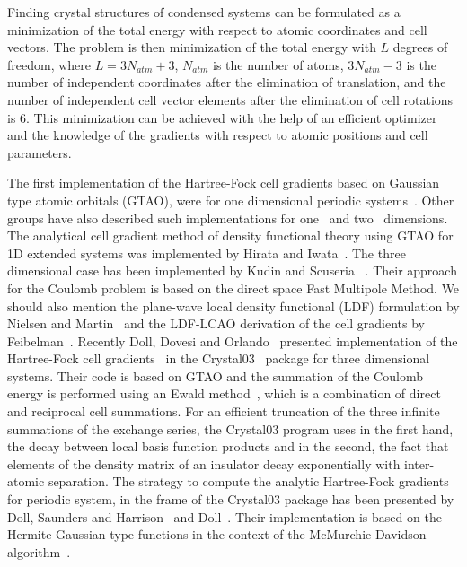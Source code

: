 \documentclass[prl,preprint,doublespace]{revtex4} %
\begin{document}
Finding crystal structures of condensed systems can
be formulated as a minimization of the total energy 
with respect to atomic coordinates and cell vectors.
The problem is then minimization of the total energy with $L$ degrees of freedom, where
$L=3N_{atm}+3$, $N_{atm}$ is the number of atoms, $3N_{atm}-3$ is the number
of independent coordinates after the elimination of translation, 
and the number of independent cell vector elements
after the elimination of cell rotations is 6.
This minimization can be achieved with the help of an efficient optimizer~\cite{KNemeth04,TBucko05,KNemeth05}
and the knowledge of the gradients with respect to atomic positions and cell parameters.
                                  
The first implementation of the Hartree-Fock cell gradients based on 
Gaussian type atomic orbitals (GTAO),
were for one dimensional periodic systems~\cite{HTeramae83,HTeramae84}. 
Other groups have also described such implementations for 
one~\cite{DJacquemin99A,DJacquemin99B} and two~\cite{MTobita03} dimensions. 
The analytical cell gradient method of density functional theory using GTAO for 
1D extended systems was implemented by Hirata and Iwata~\cite{SHirata98}.
The three dimensional case has been implemented by Kudin and Scuseria 
~\cite{KKudin00A,KKudin00B}. Their approach for the Coulomb problem is 
based on the direct space Fast Multipole Method.
We should also mention the plane-wave local density functional (LDF) formulation
by Nielsen and Martin~\cite{ONielsen85} and the LDF-LCAO derivation of 
the cell gradients by Feibelman~\cite{PFeibelman91}.
Recently Doll, Dovesi and Orlando~\cite{KDoll04} presented 
implementation of the Hartree-Fock cell gradients~\cite{RDovesi00} in 
the {\sc Crystal03}~\cite{Crystal03} package for three dimensional systems. 
Their code is based on GTAO and the summation 
of the Coulomb energy is performed using an Ewald method~\cite{PEwald21}, 
which is a combination of direct and reciprocal cell summations.
For an efficient truncation of the three infinite summations of the exchange
series, the {\sc Crystal03} program uses in the first hand, the decay between local basis function 
products and in the second, the fact that elements of the density 
matrix of an insulator decay exponentially with inter-atomic separation.
The strategy to compute the analytic Hartree-Fock gradients for 
periodic system, in the frame of the {\sc Crystal03} package has been 
presented by Doll, Saunders and Harrison~\cite{KDoll01} and Doll~\cite{KDoll01a}.
Their implementation is based on the Hermite Gaussian-type functions
in the context of the McMurchie-Davidson algorithm~\cite{LMcmurchie78}.
\end{document}
